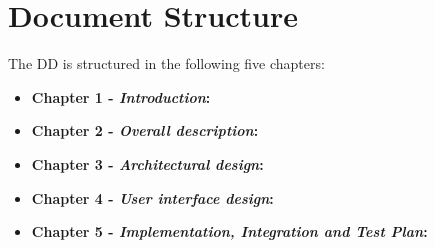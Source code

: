 \section{Document Structure}

The DD is structured in the following five chapters:
\begin{itemize}
\item \textbf{Chapter 1 -  \textit{Introduction}:} 

\item \textbf{Chapter 2 -  \textit{Overall description}:} 

\item \textbf{Chapter 3 -  \textit{Architectural design}:} 

\item \textbf{Chapter 4 -  \textit{User interface design}:} 

\item \textbf{Chapter 5 -  \textit{Implementation, Integration and Test Plan}:}

\end{itemize}